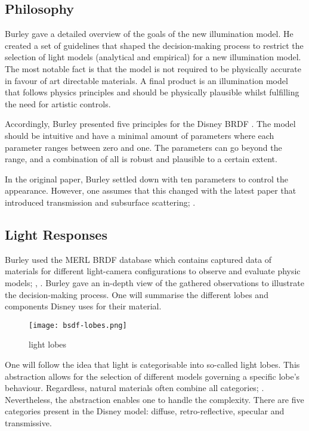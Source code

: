 \subsection*{Philosophy}

Burley \cite{burley_physically_2012} gave a detailed overview of the goals of the new illumination model.
He created a set of guidelines that shaped the decision-making process to restrict the selection of light models (analytical and empirical) for a new illumination model.
The most notable fact is that the model is not required to be physically accurate in favour of art directable materials.
A final product is an illumination model that follows physics principles and should be physically plausible whilst fulfilling the need for artistic controls.

Accordingly, Burley presented five principles for the Disney BRDF \cite{burley_physically_2012}.
The model should be intuitive and have a minimal amount of parameters where each parameter ranges between zero and one.
The parameters can go beyond the range, and a combination of all is robust and plausible to a certain extent.

In the original paper, Burley \cite{burley_physically_2012} settled down with ten parameters to control the appearance.
However, one assumes that this changed with the latest paper that introduced transmission and subsurface scattering; \cite{burley_extending_2015}.

\subsection*{Light Responses}

Burley used the MERL BRDF database which contains captured data of materials for different light-camera configurations to observe and evaluate physic models; \cite{matusik_data-driven_2003}, \cite{burley_physically_2012}.
Burley gave an in-depth view of the gathered observations to illustrate the decision-making process.
One will summarise the different lobes and components Disney uses for their material.

\begin{figure}[h]
    \begin{center}
        \texttt{[image: bsdf-lobes.png]}
    \end{center}
    \caption[]{light lobes}
    \label{fig:lobes}
\end{figure}

One will follow the idea that light is categorisable into so-called light lobes.
This abstraction allows for the selection of different models governing a specific lobe's behaviour.
Regardless, natural materials often combine all categories; \cite{cook_reflectance_1982}.
Nevertheless, the abstraction enables one to handle the complexity.
There are five categories present in the Disney model: diffuse, retro-reflective, specular and transmissive.

